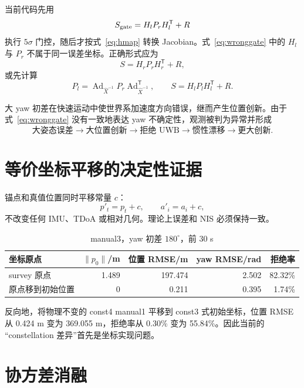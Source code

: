 \documentclass[10pt,a4paper]{ctexart}
\begin{document}
当前代码先用
\begin{equation}
S_{\rm gate}=H_lP_rH_l^\mathsf T+R
\label{eq:wronggate}
\end{equation}
执行 $5\sigma$ 门控，随后才按式~\eqref{eq:hmap} 转换 Jacobian。式~\eqref{eq:wronggate}
中的 $H_l$ 与 $P_r$ 不属于同一误差坐标。正确形式应为
\begin{equation}
S=H_rP_rH_r^\mathsf T+R,
\label{eq:rightgate}
\end{equation}
或先计算
\begin{equation}
P_l=\operatorname{Ad}_{\hat X^{-1}}P_r
\operatorname{Ad}_{\hat X^{-1}}^\mathsf T,\qquad
S=H_lP_lH_l^\mathsf T+R.
\end{equation}

大 yaw 初差在快速运动中使世界系加速度方向错误，继而产生位置创新。由于
式~\eqref{eq:wronggate} 没有一致地表达 yaw 不确定性，观测被判为异常并形成
\[
\text{大姿态误差}\to\text{大位置创新}\to\text{拒绝 UWB}
\to\text{惯性漂移}\to\text{更大创新}.
\]

\section{等价坐标平移的决定性证据}

锚点和真值位置同时平移常量 $c$：
\begin{equation}
p'_t=p_t+c,\qquad a'_i=a_i+c,
\end{equation}
不改变任何 IMU、TDoA 或相对几何。理论上误差和 NIS 必须保持一致。

\begin{table}[htbp]
\centering
\caption{manual3，yaw 初差 $180^\circ$，前 30 s}
\begin{tabular}{lrrrr}
\toprule
坐标原点 & $\|p_0\|$/m & 位置 RMSE/m & yaw RMSE/rad & 拒绝率\\
\midrule
survey 原点 & 1.489 & 197.474 & 2.502 & 82.32\%\\
原点移到初始位置 & 0 & 0.211 & 0.395 & 1.74\%\\
\bottomrule
\end{tabular}
\end{table}

反向地，将物理不变的 const4 manual1 平移到 const3 式初始坐标，位置 RMSE 从
0.424 m 变为 369.055 m，拒绝率从 0.30\% 变为 55.84\%。因此当前的
``constellation 差异''首先是坐标实现问题。

\section{协方差消融}
\end{document}
